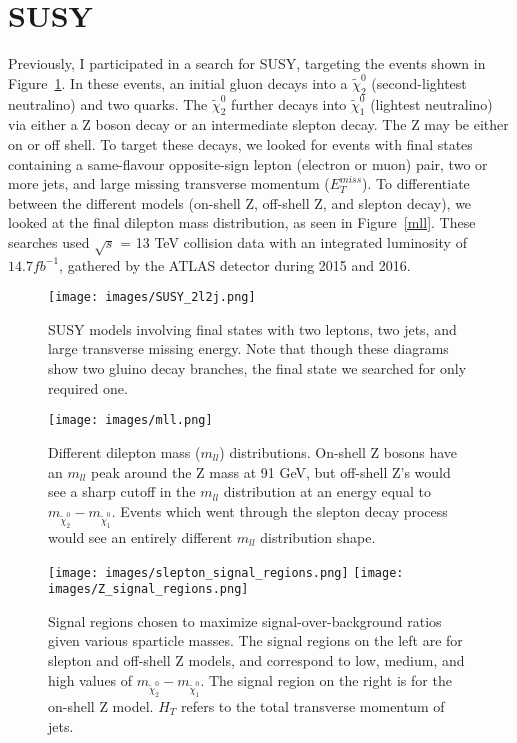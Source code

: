 
\section{SUSY}

Previously, I participated in a search for SUSY, targeting the events shown in Figure~\ref{SUSY_2l2j}. In these events, an initial gluon decays into a $\tilde{\chi}^0_2$ (second-lightest neutralino) and two quarks. The $\tilde{\chi}^0_2$ further decays into $\tilde{\chi}^0_1$ (lightest neutralino) via either a Z boson decay or an intermediate slepton decay. The Z may be either on or off shell. To target these decays, we looked for events with final states containing a same-flavour opposite-sign lepton (electron or muon) pair, two or more jets, and large missing transverse momentum ($E_T^{miss}$). To differentiate between the different models (on-shell Z, off-shell Z, and slepton decay), we looked at the final dilepton mass distribution, as seen in Figure~\ref{mll}. These searches used $\sqrt{s}$ = 13 TeV collision data with an integrated luminosity of $14.7 fb^{-1}$, gathered by the ATLAS detector during 2015 and 2016.

\begin{figure}[t]
    \centering
    \texttt{[image: images/SUSY\_2l2j.png]}
    \caption{SUSY models involving final states with two leptons, two jets, and large transverse missing energy. Note that though these diagrams show two gluino decay branches, the final state we searched for only required one.}
    \label{SUSY_2l2j}
\end{figure}

\begin{figure}[t]
    \centering
    \texttt{[image: images/mll.png]}
    \caption{Different dilepton mass ($m_{ll}$) distributions. On-shell Z bosons have an $m_{ll}$ peak around the Z mass at 91 GeV, but off-shell Z's would see a sharp cutoff in the $m_{ll}$ distribution at an energy equal to $m_{\tilde{\chi}^0_2} - m_{\tilde{\chi}^0_1}$. Events which went through the slepton decay process would see an entirely different $m_{ll}$ distribution shape.}
    \label{mll}
    
	\centering
    \texttt{[image: images/slepton\_signal\_regions.png]}
    \texttt{[image: images/Z\_signal\_regions.png]}
    \caption{Signal regions chosen to maximize signal-over-background ratios given various sparticle masses. The signal regions on the left are for slepton and off-shell Z models, and correspond to low, medium, and high values of $m_{\tilde{\chi}^0_2} - m_{\tilde{\chi}^0_1}$. The signal region on the right is for the on-shell Z model. $H_T$ refers to the total transverse momentum of jets.}
    \label{signal_regions}
\end{figure}

